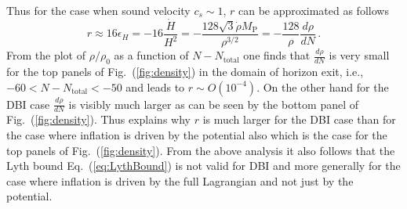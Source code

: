\documentclass[11pt]{article}
\begin{document}
Thus for the case when sound velocity $c_s \sim 1$, $r$ can be approximated as follows
\begin{equation} \label{eq:rFromDDensityDN}
  r \approx 16 \epsilon_H
          = - 16 \frac{\dot H}{H^2}
          = - \frac{128 \sqrt{3} \dot\rho M_\text{P}}{\rho^{3 / 2}}
          = - \frac{128}{\rho} \frac{d\rho}{dN}\,.
\end{equation}
From the plot of $\rho / \rho_0$ as a function of $N - N_{\text{total}}$ one finds that $\frac{d\rho}{dN}$ is very small for the top panels of Fig.~(\ref{fig:density}) in the domain of horizon exit, i.e., $-60 < N - N_\text{total} < -50$ and leads to $r \sim O\left(10^{-4}\right)$.
On the other hand for the DBI case $\frac{d\rho}{dN}$ is visibly much larger as can be seen by the bottom panel of Fig.~(\ref{fig:density}).
Thus explains why $r$ is much larger for the DBI case than for the case where inflation is driven by the potential also which is the case for the top panels of Fig.~(\ref{fig:density}).
From the above analysis it also follows that the Lyth bound Eq.~(\ref{eq:LythBound}) is not valid for DBI and more generally for the case where inflation is driven by the full Lagrangian and not just by the potential.
\end{document}
